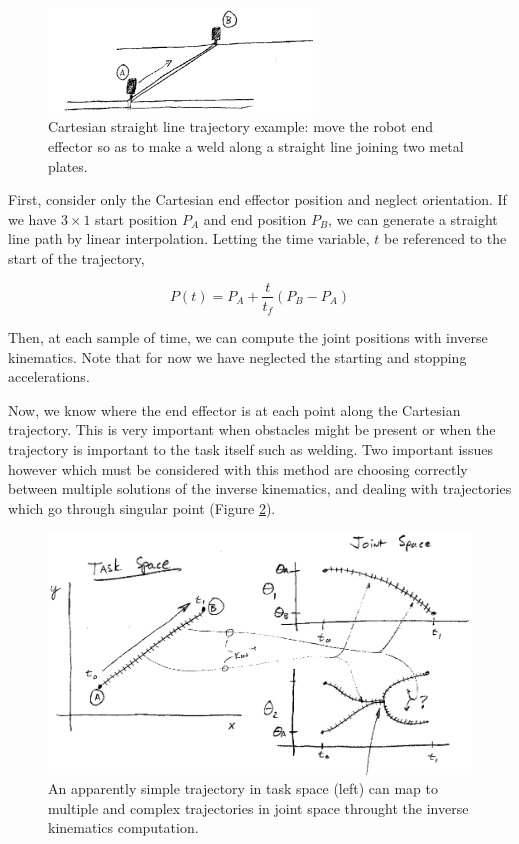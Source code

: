 \begin{figure}\centering
\includegraphics[width= 7.0cm]{figs07/00517.eps}
\caption{Cartesian straight line trajectory example: move the robot end effector so as to make a weld along a straight line joining two metal plates.}\label{straightweld}
\end{figure}



First, consider only the Cartesian end effector position and neglect orientation.  If we have $3\times1$ start position $P_A$ and end position $P_B$, we can generate a straight line path by linear interpolation.  Letting the time variable, $t$ be referenced to the start of the trajectory,

\[
P(t) = P_A + \frac{t}{t_f}(P_B-P_A)
\]

Then, at each sample of time, we can compute the joint positions with inverse kinematics. Note that for now we have neglected the starting and stopping accelerations.

Now, we know where the end effector is at each point along the Cartesian trajectory.  This is very important when obstacles might be present or when the trajectory is important to the task itself such as welding.  Two important issues however which must be considered with this method are choosing correctly between multiple solutions of the inverse kinematics, and dealing with trajectories which go through singular point (Figure \ref{trajectorymapping}).


\begin{figure}\centering
\includegraphics[width=14cm]{figs07/00518.eps}
\caption{An apparently simple trajectory in task space (left) can map to multiple and complex trajectories in joint space throught the inverse kinematics computation.}\label{trajectorymapping}
\end{figure}



